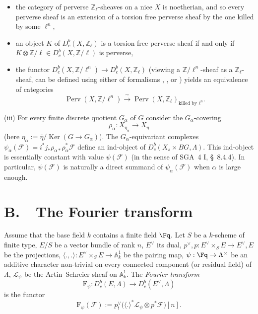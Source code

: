 \documentclass[12pt,oneside]{amsbook}
\theoremstyle{plain}
\theoremstyle{definition}
\newcommand{\FF}{\mathcal{F}}
\newcommand{\LL}{\mathcal{L}}
\newcommand{\ZZ}{\mathbb{Z}}  \newcommand{\QQ}{\mathbb{Q}}
\newcommand{\Zl}{\mathbb{Z}_{\ell}}
\newcommand{\Dbc}{D^{b}_{c}}
\DeclareMathOperator{\Ker}{Ker}
\DeclareMathOperator{\Perv}{Perv}
\newcommand{\isoto}{\xrightarrow{\ \sim\ }}
\begin{document}
\begin{itemize}[leftmargin=2.4em,itemsep=2pt]
\item[(a)] the category of perverse $\Zl$-sheaves on a nice $X$ is noetherian, and so every perverse sheaf is an extension of a torsion free perverse sheaf by the one killed by some $\ell^{n}$,
\item[(b)] an object $K$ of $\Dbc(X,\Zl)$ is a torsion free perverse sheaf if and only if $K\otimes\ZZ/\ell\in\Dbc(X,\ZZ/\ell)$ is perverse,
\item[(c)] the functor $\Dbc(X,\ZZ/\ell^{n})\to\Dbc(X,\Zl)$ (viewing a $\ZZ/\ell^{n}$-sheaf as a $\Zl$-sheaf, can be defined using either of formalisms \cite{BS15}, \cite{Eke90}, or \cite{GL17}) yields an equivalence of categories
  \[
    \Perv(X,\ZZ/\ell^{n})\isoto\Perv(X,\Zl)_{\text{killed by }\ell^{n}}.
  \]
\end{itemize}

\smallskip
(iii) For every finite discrete quotient $G_{\alpha}$ of $G$ consider the $G_{\alpha}$-covering
\[
  \rho_{\alpha}:X_{\eta_{\alpha}}\longrightarrow X_{\eta}
\]
(here $\eta_{\alpha}:=\bar\eta/\Ker(G\to G_{\alpha})$). The $G_{\alpha}$-equivariant complexes $\psi_{\alpha}(\FF)=i^{*}j_{*}\rho_{\alpha*}\rho_{\alpha}^{*}\FF$ define an ind-object of $\Dbc(X_{s}\times BG,\Lambda)$. This ind-object is essentially constant with value $\psi(\FF)$ (in the sense of SGA~4 I, \S~8.4.4). In particular, $\psi(\FF)$ is naturally a direct summand of $\psi_{\alpha}(\FF)$ when $\alpha$ is large enough.

\section*{B.\ \ The Fourier transform}

Assume that the base field $k$ contains a finite field $\Fq$. Let $S$ be a $k$-scheme of finite type, $E/S$ be a vector bundle of rank $n$, $E^{\vee}$ its dual, $p^{\vee},p:E^{\vee}\times_{S}E\to E^{\vee},E$ be the projections, $\langle .,.\rangle:E^{\vee}\times_{S}E\to\mathbb{A}^{1}_{k}$ be the pairing map, $\psi:\Fq\to\Lambda^{\times}$ be an additive character non-trivial on every connected component (or residual field) of $\Lambda$, $\LL_{\psi}$ be the Artin--Schreier sheaf on $\mathbb{A}^{1}_{k}$. The \emph{Fourier transform}
\[
  \mathrm{F}_{\psi}:\Dbc(E,\Lambda)\longrightarrow\Dbc(E^{\vee},\Lambda)
\]
is the functor
\[
  \mathrm{F}_{\psi}(\FF):=p^{\vee}_{!}\bigl(\langle.\rangle^{*}\LL_{\psi}\otimes p^{*}\FF\bigr)[n].
\]
\end{document}

